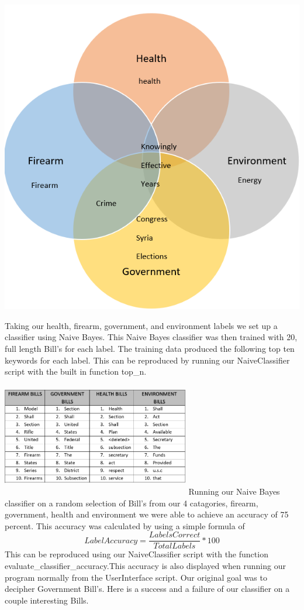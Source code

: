 \documentclass[11pt,a4paper]{article}
\begin{document}
 \includegraphics[scale=.74]{figs/Venn.PNG}
  
  Taking our health, firearm, government, and environment labels we set up a classifier using Naive Bayes. This Naive Bayes classifier was then trained with 20, full length Bill's for each label. The training data produced the following top ten keywords for each label. This can be reproduced by running our NaiveClassifier script with the built in function top\_n.
  \newline\newline
  \noindent
  \includegraphics[width=8.2cm, height=5.3cm]{figs/naivetop.PNG}
  \newline\newline
  \noindent
  Running our Naive Bayes classifier on a random selection of Bill's from our 4 catagories, firearm, government, health and environment we were able to achieve an accuracy of 75 percent. This accuracy was calculated by using a simple formula of 
  \[ Label Accuracy = \frac {Labels Correct}{Total Labels} * 100\]
  This can be reproduced using our NaiveClassifier script with the function evaluate\_classifier\_accuracy.This accuracy is also displayed when running our program normally from the UserInterface script.
  Our original goal was to decipher Government Bill's. Here is a success and a failure of our classifier on a couple interesting Bills.
 
\end{document}
